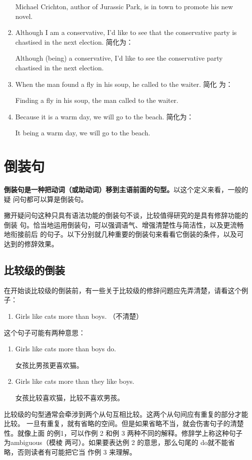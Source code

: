\begin{enumerate}
  Michael Crichton, author of Jurassic Park, is in town to promote his new
  novel.
\item Although I am a conservative, I'd like to see that the conservative party
  is chastised in the next election. 简化为：

  Although (being) a conservative, I'd like to see the conservative party
  chastised in the next election.
\item When the man found a fly in his soup, he called to the waiter. 简化
  为：

  Finding a fly in his soup, the man called to the waiter.
\item Because it is a warm day, we will go to the beach. 简化为：

  It being a warm day, we will go to the beach.
\end{enumerate}
\chapter{倒装句}

\textbf{倒装句是一种把动词（或助动词）移到主语前面的句型。}以这个定义来看，一般的疑
问句都可以算是倒装句。

撇开疑问句这种只具有语法功能的倒装句不谈，比较值得研究的是具有修辞功能的倒装
句。恰当地运用倒装句，可以强调语气、增强清楚性与简洁性，以及更流畅地衔接前后
的句子。以下分别就几种重要的倒装句来看看它倒装的条件，以及可达到的修辞效果。

\section{比较级的倒装}

在开始谈比较级的倒装前，有一些关于比较级的修辞问题应先弄清楚，请看这个例子：
\begin{enumerate}
\item Girls like cats more than boys. （不清楚）
\end{enumerate}
这个句子可能有两种意思：
\begin{enumerate}[resume]
\item Girls like cats more than boys do.

  女孩比男孩更喜欢猫。
\item Girls like cats more than they like boys.

  女孩比较喜欢猫，比较不喜欢男孩。
\end{enumerate}

比较级的句型通常会牵涉到两个从句互相比较。这两个从句间应有重复的部分才能比较。
一旦有重复，就有省略的空间。但是如果省略不当，就会伤害句子的清楚性。就像上面
的例1，可以作例 2 和例 3 两种不同的解释。修辞学上称这种句子为ambiguous（模棱
两可）。如果要表达例 2 的意思，那么句尾的 do就不能省略，否则读者有可能把它当
作例 3 来理解。

